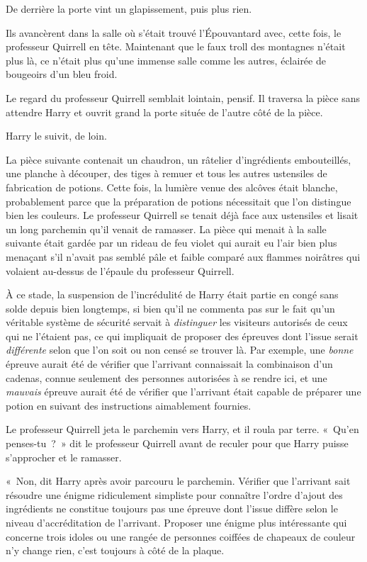 De derrière la porte vint un glapissement, puis plus rien.

Ils avancèrent dans la salle où s'était trouvé l'Épouvantard avec, cette fois, le professeur Quirrell en tête. Maintenant que le faux troll des montagnes n'était plus là, ce n'était plus qu'une immense salle comme les autres, éclairée de bougeoirs d'un bleu froid.

Le regard du professeur Quirrell semblait lointain, pensif. Il traversa la pièce sans attendre Harry et ouvrit grand la porte située de l'autre côté de la pièce.

Harry le suivit, de loin.

\later

La pièce suivante contenait un chaudron, un râtelier d'ingrédients embouteillés, une planche à découper, des tiges à remuer et tous les autres ustensiles de fabrication de potions. Cette fois, la lumière venue des alcôves était blanche, probablement parce que la préparation de potions nécessitait que l'on distingue bien les couleurs. Le professeur Quirrell se tenait déjà face aux ustensiles et lisait un long parchemin qu'il venait de ramasser. La pièce qui menait à la salle suivante était gardée par un rideau de feu violet qui aurait eu l'air bien plus menaçant s'il n'avait pas semblé pâle et faible comparé aux flammes noirâtres qui volaient au-dessus de l'épaule du professeur Quirrell.

À ce stade, la suspension de l'incrédulité de Harry était partie en congé sans solde depuis bien longtemps, si bien qu'il ne commenta pas sur le fait qu'un véritable système de sécurité servait à \emph{distinguer} les visiteurs autorisés de ceux qui ne l'étaient pas, ce qui impliquait de proposer des épreuves dont l'issue serait \emph{différente} selon que l'on soit ou non censé se trouver là. Par exemple, une \emph{bonne} épreuve aurait été de vérifier que l'arrivant connaissait la combinaison d'un cadenas, connue seulement des personnes autorisées à se rendre ici, et une \emph{mauvais} épreuve aurait été de vérifier que l'arrivant était capable de préparer une potion en suivant des instructions aimablement fournies.

Le professeur Quirrell jeta le parchemin vers Harry, et il roula par terre. «~Qu'en penses-tu~?~» dit le professeur Quirrell avant de reculer pour que Harry puisse s'approcher et le ramasser.

«~Non, dit Harry après avoir parcouru le parchemin. Vérifier que l'arrivant sait résoudre une énigme ridiculement simpliste pour connaître l'ordre d'ajout des ingrédients ne constitue toujours pas une épreuve dont l'issue diffère selon le niveau d'accréditation de l'arrivant. Proposer une énigme plus intéressante qui concerne trois idoles ou une rangée de personnes coiffées de chapeaux de couleur n'y change rien, c'est toujours à côté de la plaque.

